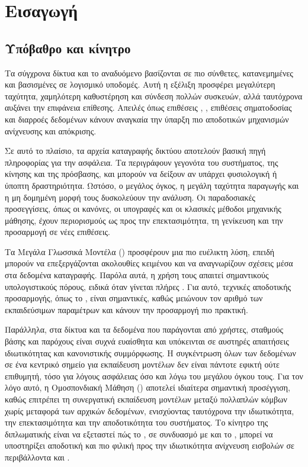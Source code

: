 \chapter{Εισαγωγή} 

\section{Υπόβαθρο και κίνητρο}

Τα σύγχρονα δίκτυα  και το αναδυόμενο  βασίζονται σε πιο σύνθετες, κατανεμημένες και βασισμένες σε λογισμικό υποδομές. Αυτή η εξέλιξη προσφέρει μεγαλύτερη ταχύτητα, χαμηλότερη καθυστέρηση και σύνδεση πολλών συσκευών, αλλά ταυτόχρονα αυξάνει την επιφάνεια επίθεσης. Απειλές όπως επιθέσεις , , επιθέσεις σηματοδοσίας και διαρροές δεδομένων κάνουν αναγκαία την ύπαρξη πιο αποδοτικών μηχανισμών ανίχνευσης και απόκρισης.

Σε αυτό το πλαίσιο, τα αρχεία καταγραφής δικτύου αποτελούν βασική πηγή πληροφορίας για την ασφάλεια. Τα  περιγράφουν γεγονότα του συστήματος, της κίνησης και της πρόσβασης, και μπορούν να δείξουν αν υπάρχει φυσιολογική ή ύποπτη δραστηριότητα. Ωστόσο, ο μεγάλος όγκος, η μεγάλη ταχύτητα παραγωγής και η μη δομημένη μορφή τους δυσκολεύουν την ανάλυση. Οι παραδοσιακές προσεγγίσεις, όπως οι κανόνες, οι υπογραφές και οι κλασικές μέθοδοι μηχανικής μάθησης, έχουν περιορισμούς ως προς την επεκτασιμότητα, τη γενίκευση και την προσαρμογή σε νέες επιθέσεις.

Τα Μεγάλα Γλωσσικά Μοντέλα () προσφέρουν μια πιο ευέλικτη λύση, επειδή μπορούν να επεξεργάζονται ακολουθίες κειμένου και να αναγνωρίζουν σχέσεις μέσα στα δεδομένα καταγραφής. Παρόλα αυτά, η χρήση τους απαιτεί σημαντικούς υπολογιστικούς πόρους, ειδικά όταν γίνεται πλήρες . Για αυτό, τεχνικές αποδοτικής προσαρμογής, όπως το , είναι σημαντικές, καθώς μειώνουν τον αριθμό των εκπαιδεύσιμων παραμέτρων και κάνουν την προσαρμογή πιο πρακτική.

Παράλληλα, στα δίκτυα  και  τα δεδομένα που παράγονται από χρήστες, σταθμούς βάσης και παρόχους είναι συχνά ευαίσθητα και υπόκεινται σε αυστηρές απαιτήσεις ιδιωτικότητας και κανονιστικής συμμόρφωσης. Η συγκέντρωση όλων των δεδομένων σε ένα κεντρικό σημείο για εκπαίδευση μοντέλων δεν είναι πάντοτε εφικτή ούτε επιθυμητή, τόσο για λόγους ασφάλειας όσο και λόγω του μεγάλου όγκου τους. Για τον λόγο αυτό, η Ομοσπονδιακή Μάθηση () αποτελεί ιδιαίτερα σημαντική προσέγγιση, καθώς επιτρέπει τη συνεργατική εκπαίδευση μοντέλων μεταξύ πολλαπλών κόμβων χωρίς μεταφορά των αρχικών δεδομένων, ενισχύοντας ταυτόχρονα την ιδιωτικότητα, την επεκτασιμότητα και την αποδοτικότητα του συστήματος. Το κίνητρο της διπλωματικής είναι να εξεταστεί πώς το , σε συνδυασμό με  και το , μπορεί να υποστηρίξει αποδοτική και πιο φιλική προς την ιδιωτικότητα ανίχνευση εισβολών σε περιβάλλοντα  και .
